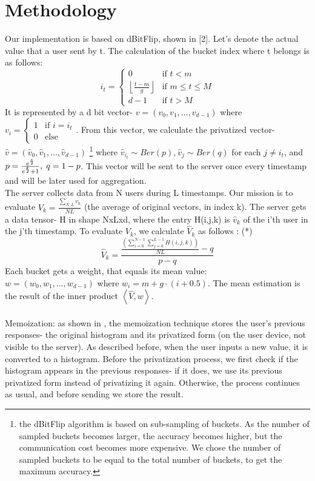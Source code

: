 \documentclass[sigconf]{acmart}
\begin{document}
\section{Methodology} Our implementation is based on dBitFlip, shown in [2]. Let's denote the actual value that a user sent by t. The calculation of the bucket index where t belongs is as follows: $$i_t =  \begin{cases}
0 & \text{if $t<m$}\\
\left \lfloor{\frac{t-m}{g}}\right \rfloor & \text{if $m\leq t \leq M$}\\
d-1 & \text{if $t>M$}    
\end{cases}$$
It is represented by a d bit vector- $v=(v_0,v_1,…,v_{d-1})$ where\\ $v_i = \begin{cases} 1 & \text{if $i=i_t$}\\
0 & \text{else} \end{cases}$.
From this vector, we calculate the privatized vector- $\hat{v}=({\hat{v}}_0,{\hat{v}}_1,\ldots,{\hat{v}}_{d-1})$ \footnote{the dBitFlip algorithm is based on sub-sampling of buckets. As the number of sampled buckets becomes larger, the accuracy becomes higher, but the communication cost becomes more expensive. We chose the number of sampled buckets to be equal to the total number of buckets, to get the maximum accuracy.} where ${\hat{v}}_{i_t}\sim Ber\left(p\right)$,$\ {\hat{v}}_j \sim  Ber\left(q\right)$ for each $j\neq i_t$, and $p=\frac{e^\frac{\varepsilon}{2}}{e^\frac{\varepsilon}{2}+1},\hspace{1 mm} q=1-p$. This vector will be sent to the server once every timestamp and will be later used for aggregation.\\
The server collects data from N users during L timestamps. Our mission is to evaluate $V_k=\frac{\mathrm{\sum}_{N, L} v_k}{NL}$ (the average of original vectors, in index k). The server gets a data tensor- H in shape NxLxd, where the entry H(i,j,k) is ${\hat{v}}_k$ of the i'th user in the j'th timestamp. To evaluate $V_k$, we calculate ${\hat{V}}_k$ as follows \cite{3_wang2020comprehensive}: (*) $${\hat{V}}_k=\frac{\frac{\left(\sum_{i=0}^{N-1}\sum_{j=0}^{L-1}H\left(i,j,k\right)\right)}{NL}-q}{p-q}$$  
Each bucket gets a weight, that equals its mean value: \\
$w=(w_0,w_1,…,w_{d-1})$ where
 $w_i=m+g\cdot(i+0.5)$. The mean estimation is the result of the inner product $\left\langle\hat{V},w\right\rangle$.\\ \\
Memoization: as shown in \cite{2_ding2017collecting}, the memoization technique stores the user's previous responses- the original histogram and its privatized form (on the user device, not visible to the server). As described before, when the user inputs a new value, it is converted to a histogram. Before the privatization process, we first check if the histogram appears in the previous responses- if it does, we use its previous privatized form instead of privatizing it again. Otherwise, the process continues as usual, and before sending we store the result.
\end{document}
